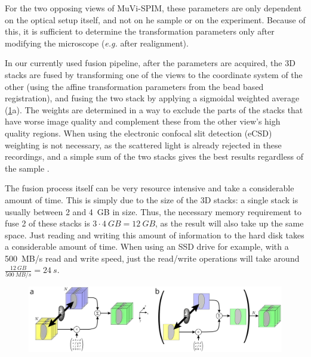 For the two opposing views of MuVi-SPIM, these parameters are only dependent on the optical setup itself, and not on he sample or on the experiment. Because of this, it is sufficient to determine the transformation parameters only after modifying the microscope (\textit{e.g.} after realignment).

In our currently used fusion pipeline, after the parameters are acquired, the 3D stacks are fused by transforming one of the views to the coordinate system of the other (using the affine transformation parameters from the bead based registration), and fusing the two stack by applying a sigmoidal weighted average (\ref{fig:acquisition}a). The weights are determined in a way to exclude the parts of the stacks that have worse image quality and complement these from the other view's high quality regions. When using the electronic confocal slit detection (eCSD) weighting is not necessary, as the scattered light is already rejected in these recordings, and a simple sum of the two stacks gives the best results regardless of the sample \cite{de_medeiros_confocal_2015}.

The fusion process itself can be very resource intensive and take a considerable amount of time. This is simply due to the size of the 3D stacks: a single stack is usually between 2 and \SI{4}{GB} in size. Thus, the necessary memory requirement to fuse 2 of these stacks is $3\cdot \SI{4}{GB} = \SI{12}{GB}$, as the result will also take up the same space. Just reading and writing this amount of information to the hard disk takes a considerable amount of time. When using an SSD drive for example, with a \SI{500}{MB/s} read and write speed, just the read/write operations will take around $\frac{\SI{12}{GB}}{\SI{500}{MB/s}} = \SI{24}{s}$.


\begin{figure}
  \centering
  \includegraphics[width=1\columnwidth]{fusion/acquisition}
  \label{fig:acquisition}
\end{figure}

